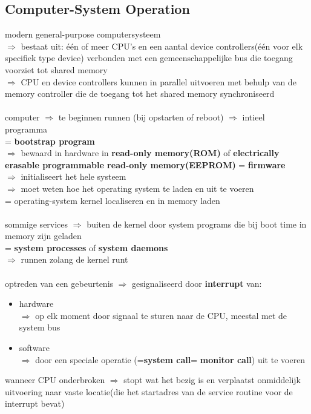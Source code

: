 \documentclass{report}
\begin{document}
\subsection{Computer-System Operation}
modern general-purpose computersysteem
\\$\Rightarrow$ bestaat uit: \'e\'en of meer CPU's en een aantal device controllers(\'e\'en voor elk specifiek type device) verbonden met een gemeenschappelijke bus die toegang voorziet tot shared memory
\\$\Rightarrow$ CPU en device controllers kunnen in parallel uitvoeren met behulp van de memory controller die de toegang tot het shared memory synchroniseerd
\\
\\computer $\Rightarrow$ te beginnen runnen (bij opstarten of reboot) $\Rightarrow$ intieel programma 
\\= \textbf{bootstrap program}
\\$\Rightarrow$ bewaard in hardware in \textbf{read-only memory(ROM)} of \textbf{electrically erasable programmable read-only memory(EEPROM)} = \textbf{firmware}
\\$\Rightarrow$ initialiseert het hele systeem
\\$\Rightarrow$ moet weten hoe het operating system te laden en uit te voeren
\\= operating-system kernel localiseren en in memory laden
\\
\\sommige services $\Rightarrow$ buiten de kernel door system programs die bij boot time in memory zijn geladen
\\ = \textbf{system processes} of \textbf{system daemons}
\\ $\Rightarrow$ runnen zolang de kernel runt
\\
\\optreden van een gebeurtenis $\Rightarrow$ gesignaliseerd door \textbf{interrupt} van:
\begin{itemize}
\item hardware
\\$\Rightarrow$ op elk moment door signaal te sturen naar de CPU, meestal met de system bus
\item software
\\$\Rightarrow$ door een speciale operatie (=\textbf{system call}= \textbf{monitor call}) uit te voeren
\end{itemize}
wanneer CPU onderbroken $\Rightarrow$ stopt wat het bezig is en verplaatst onmiddelijk uitvoering naar vaste locatie(die het startadres van de service routine voor de interrupt bevat)
\end{document}

